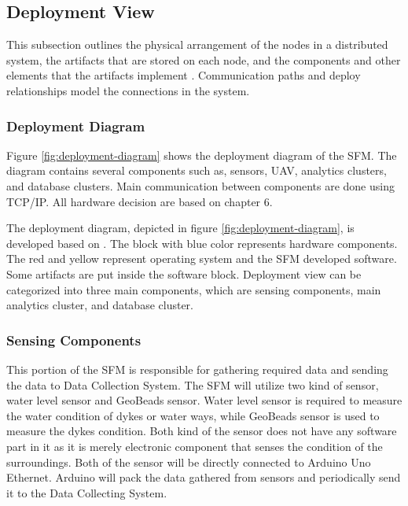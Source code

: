 \clearpage
\subsection{Deployment View}
This subsection outlines the physical arrangement of the nodes in a distributed system, the artifacts that are stored on each node, and the components and other elements that the artifacts implement \cite{ibmdeployment}. Communication paths and deploy relationships model the connections in the system.

\subsubsection{Deployment Diagram}
Figure \ref{fig:deployment-diagram} shows the deployment diagram of the \gls{SFM}. The diagram contains several components such as, sensors, \gls{UAV}, analytics clusters, and database clusters. Main communication between components are done using TCP/IP. All hardware decision are based on chapter 6.
	

\begin{landscape}
	\begin{figure}[H]
		\centering
		\texttt{[image: \{\\viewimages/deployment-view]}.png}
		\caption{Deployment diagram}
		\label{fig:deployment-diagram}
	\end{figure}
\end{landscape}


The deployment diagram, depicted in figure \ref{fig:deployment-diagram}, is developed based on \cite{ibmdeployment}. The block with blue color represents hardware components. The red and yellow represent operating system and the SFM developed software. Some artifacts are put inside the software block. Deployment view can be categorized into three main components, which are sensing components, main analytics cluster, and database cluster.

\subsubsection*{Sensing Components}
This portion of the \gls{SFM} is responsible for gathering required data and sending the data to Data Collection System. The \gls{SFM} will utilize two kind of sensor, water level sensor and GeoBeads sensor. Water level sensor is required to measure the water condition of dykes or water ways, while GeoBeads sensor is used to measure the dykes condition. Both kind of the sensor does not have any software part in it as it is merely electronic component that senses the condition of the surroundings. Both of the sensor will be directly connected to Arduino Uno Ethernet. Arduino will pack the data gathered from sensors and periodically send it to the Data Collecting System.

